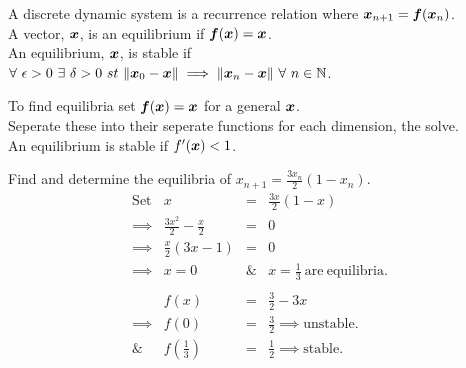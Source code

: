 \documentclass[11pt,a4paper]{article}
\begin{document}
\subtitle{Theory}
A discrete dynamic system is a recurrence relation where $\boldsymbol{x}_{n+1} = \boldsymbol{f}(\boldsymbol{x}_n)$.\\
A vector, $\boldsymbol{x}$, is an equilibrium if $\boldsymbol{f}(\boldsymbol{x}) = \boldsymbol{x}$.\\
An equilibrium, $\boldsymbol{x}$, is stable if\\
\-\hspace{2em} $\forall\ \epsilon > 0\ \exists\ \delta > 0\ st\ \|\boldsymbol{x}_0 - \boldsymbol{x}\| \implies \|\boldsymbol{x}_n - \boldsymbol{x}\|\ \forall\ n \in \mathbb{N}$.\\

\subtitle{Process}
To find equilibria set $\boldsymbol{f}(\boldsymbol{x}) = \boldsymbol{x}$ for a general $\boldsymbol{x}$.\\
Seperate these into their seperate functions for each dimension, the solve.\\
An equilibrium is stable if $f'(\boldsymbol{x}) < 1$.\\

\subtitle{Example}
Find and determine the equilibria of $x_{n+1} = \frac{3x_n}{2}(1-x_n)$.\\
\[\begin{array}{rrcl}
\mathrm{Set}& x &=& \frac{3x}{2}(1-x)\\
\implies& \frac{3x^2}{2} - \frac{x}{2} &=& 0\\
\implies& \frac{x}{2}(3x-1) &=& 0\\
\implies& x=0 &\&& x = \frac{1}{3} \mathrm{\ are\ equilibria.}\\
\\&f(x) &=& \frac{3}{2}-3x\\
\implies& f(0) &=& \frac{3}{2} \implies \mathrm{unstable}.\\
\&& f(\frac{1}{3}) &=& \frac{1}{2} \implies \mathrm{stable}.
\end{array}\]
\end{document}
